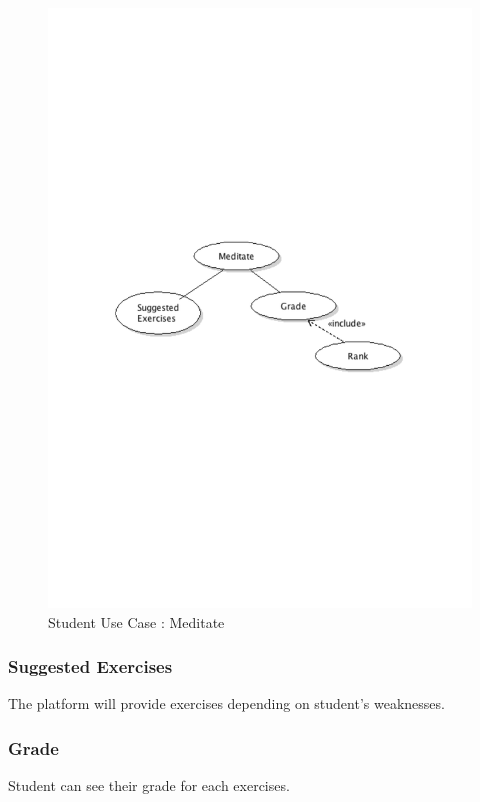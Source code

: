 	\begin{figure}[ht]
			\begin{center}
				\includegraphics[width=\textwidth,  trim=2cm 10cm 2cm 11cm]{UML_figure/UC/student/UC_Student_Meditate.pdf}
				\caption{Student Use Case : Meditate}
			\end{center}
		\end{figure}
		\subsubsection{Suggested Exercises}
			The platform will provide exercises depending on student's weaknesses.
		\subsubsection{Grade}
			Student can see their grade for each exercises.
\newpage

